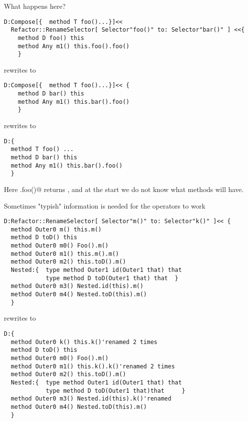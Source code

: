 \begin{frame}[fragile]
What happens here?
\begin{NiceCode}{59ex}{0.8}
\begin{lstlisting}
D:Compose[{  method T foo()...}]<<
  Refactor::RenameSelector[ Selector"foo()" to: Selector"bar()" ] <<{
    method D foo() this
    method Any m1() this.foo().foo()
    }
\end{lstlisting}
\end{NiceCode}
rewrites to 
\begin{NiceCode}{59ex}{0.8}
\begin{lstlisting}
D:Compose[{  method T foo()...}]<< {
    method D bar() this
    method Any m1() this.bar().foo()
    }
\end{lstlisting}
\end{NiceCode}
rewrites to 
\begin{NiceCode}{59ex}{0.8}
\begin{lstlisting}
D:{
  method T foo() ...
  method D bar() this
  method Any m1() this.bar().foo()
  }
\end{lstlisting}
\end{NiceCode}
Here \Q@this.foo()@ returns \Q@D@, and at the start we do not know what methods
\Q@D@ will have.
\end{frame}



\begin{frame}[fragile]
Sometimes "typish" information is needed for the operators to work
\begin{NiceCode}{59ex}{0.8}
\begin{lstlisting}
D:Refactor::RenameSelector[ Selector"m()" to: Selector"k()" ]<< {
  method Outer0 m() this.m()
  method D toD() this
  method Outer0 m0() Foo().m()
  method Outer0 m1() this.m().m()
  method Outer0 m2() this.toD().m()
  Nested:{  type method Outer1 id(Outer1 that) that
            type method D toD(Outer1 that) that  }
  method Outer0 m3() Nested.id(this).m()
  method Outer0 m4() Nested.toD(this).m()
  }
\end{lstlisting}
\end{NiceCode}
rewrites to 

\begin{NiceCode}{59ex}{0.8}
\begin{lstlisting}
D:{
  method Outer0 k() this.k()'renamed 2 times
  method D toD() this
  method Outer0 m0() Foo().m()
  method Outer0 m1() this.k().k()'renamed 2 times
  method Outer0 m2() this.toD().m()
  Nested:{  type method Outer1 id(Outer1 that) that 
            type method D toD(Outer1 that)that     }
  method Outer0 m3() Nested.id(this).k()'renamed
  method Outer0 m4() Nested.toD(this).m()
  }
\end{lstlisting}
\end{NiceCode}
\end{frame}


